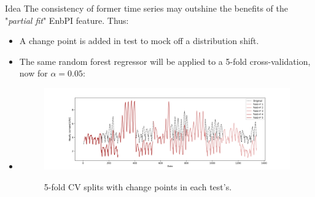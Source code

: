 \documentclass{beamer}
\renewcommand{\a}{\alpha}
\begin{document}

\begin{frame}{Idea}
    The consistency of former time series may outshine the benefits of the "\textit{partial fit}" EnbPI feature. Thus:
    \begin{itemize}%
        \item A change point is added in test to mock off a distribution shift.
        \item The same random forest regressor will be applied to a 5-fold cross-validation, now for $\a=0.05$: %
        \item[]
            \hspace{-5mm}
            \vspace{-7mm}
            \begin{figure}
                \includegraphics[width=\textwidth]{Figures/timeseries/with-change-point/ts-with-change-point-5-folds.png}
                \label{fig:ts-splits-cpoint}
                \vspace{-2mm}
                \caption{5-fold CV splits with change points in each test's.}
        \end{figure} 
    \end{itemize}
\end{frame}

\end{document}
